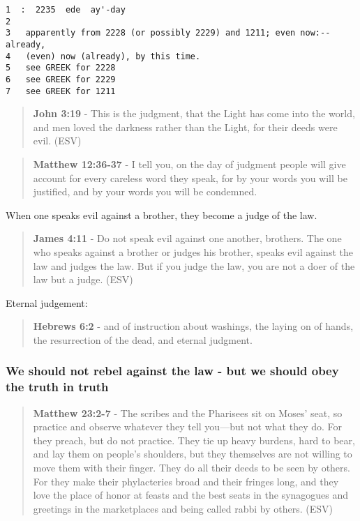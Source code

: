 \documentclass[11pt]{article}
\begin{document}
\begin{verbatim}
1  :  2235  ede  ay'-day
2  
3   apparently from 2228 (or possibly 2229) and 1211; even now:--already,
4   (even) now (already), by this time.
5   see GREEK for 2228
6   see GREEK for 2229
7   see GREEK for 1211
\end{verbatim}

\begin{quote}
\textbf{John 3:19} - This is the judgment, that the Light has come into the world, and men loved the darkness rather than the Light, for their deeds were evil. (ESV)
\end{quote}

\begin{quote}
\textbf{Matthew 12:36-37} - I tell you, on the day of judgment people will give account for every careless word they speak, for by your words you will be justified, and by your words you will be condemned.
\end{quote}

When one speaks evil against a brother, they become a judge of the law.

\begin{quote}
\textbf{James 4:11} - Do not speak evil against one another, brothers. The one who speaks against a brother or judges his brother, speaks evil against the law and judges the law. But if you judge the law, you are not a doer of the law but a judge. (ESV)
\end{quote}

Eternal judgement:

\begin{quote}
\textbf{Hebrews 6:2} - and of instruction about washings, the laying on of hands, the resurrection of the dead, and eternal judgment.
\end{quote}

\subsubsection{We should not rebel against the law - but we should obey the truth in truth}
\label{sec:org172a8a9}
\begin{quote}
\textbf{Matthew 23:2-7} - The scribes and the Pharisees sit on Moses' seat, so practice and observe whatever they tell you—but not what they do. For they preach, but do not practice. They tie up heavy burdens, hard to bear, and lay them on people's shoulders, but they themselves are not willing to move them with their finger. They do all their deeds to be seen by others. For they make their phylacteries broad and their fringes long, and they love the place of honor at feasts and the best seats in the synagogues and greetings in the marketplaces and being called rabbi by others. (ESV)
\end{quote}
\end{document}
